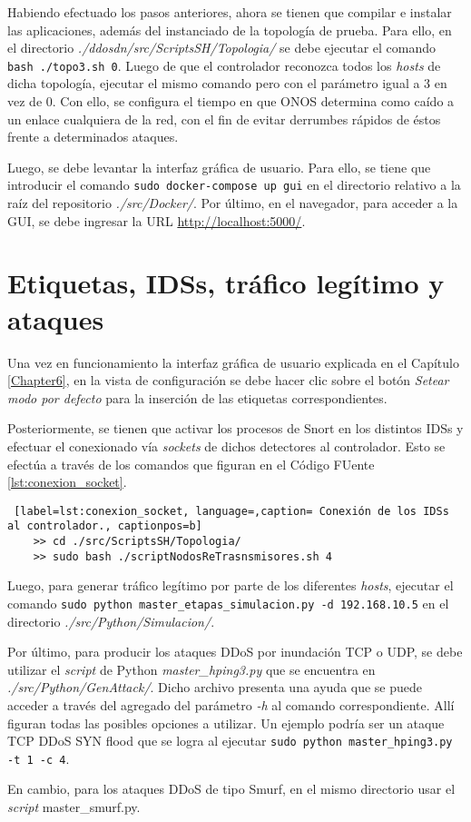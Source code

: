Habiendo efectuado los pasos anteriores, ahora se tienen que compilar e instalar las aplicaciones, además del instanciado de la topología de prueba. Para ello, en el directorio \textit{./ddosdn/src/ScriptsSH/Topologia/} se debe ejecutar el comando \texttt{bash ./topo3.sh 0}. Luego de que el controlador reconozca todos los \textit{hosts} de dicha topología, ejecutar el mismo comando pero con el parámetro igual a 3 en vez de 0. Con ello, se configura el tiempo en que ONOS determina como caído a un enlace cualquiera de la red, con el fin de evitar derrumbes rápidos de éstos frente a determinados ataques.

Luego, se debe levantar la interfaz gráfica de usuario. Para ello, se tiene que introducir el comando \texttt{sudo docker-compose up gui} en el directorio relativo a la raíz del repositorio
 \textit{./src/Docker/}. Por último, en el navegador, para acceder a la GUI, se debe ingresar la URL \url{http://localhost:5000/}.

\section {Etiquetas, IDSs, tráfico legítimo y ataques}

Una vez en funcionamiento la interfaz gráfica de usuario explicada en el Capítulo \ref{Chapter6}, en la vista de configuración se debe hacer clic sobre el botón \textit{Setear modo por defecto} para la inserción de las etiquetas correspondientes.

Posteriormente, se tienen que activar los procesos de Snort en los distintos
IDSs y efectuar el conexionado vía \textit{sockets} de dichos detectores al controlador.
Esto se efectúa a través de los comandos que figuran en el Código FUente \ref{lst:conexion_socket}. \\


\begin{lstlisting} [label=lst:conexion_socket, language=,caption= Conexión de los IDSs al controlador., captionpos=b]
    >> cd ./src/ScriptsSH/Topologia/
    >> sudo bash ./scriptNodosReTrasnsmisores.sh 4
\end{lstlisting}

Luego, para generar tráfico legítimo por parte de los diferentes \textit{hosts}, ejecutar el comando \texttt{sudo python master\_etapas\_simulacion.py -d 192.168.10.5} en el directorio \textit{./src/Python/Simulacion/}.

Por último, para producir los ataques DDoS por inundación TCP o UDP, se debe utilizar el \textit{script} de Python \textit{master\_hping3.py} que se encuentra en \textit{./src/Python/GenAttack/}. Dicho archivo presenta una ayuda que se puede acceder a través del agregado del parámetro \textit{-h} al comando correspondiente. Allí figuran todas las posibles opciones a utilizar. Un ejemplo podría ser un ataque TCP DDoS SYN flood que se logra al ejecutar \texttt{sudo python master\_hping3.py -t 1 -c 4}.

En cambio, para los ataques DDoS de tipo Smurf, en el mismo directorio usar el \textit{script} master\_smurf.py. 